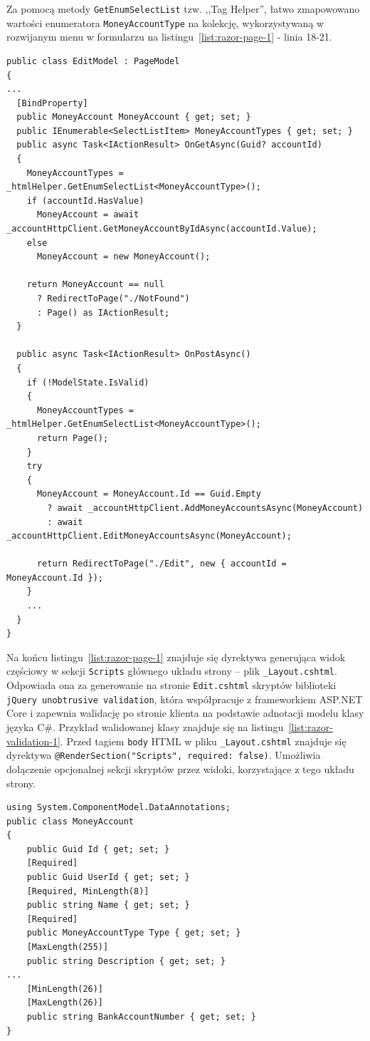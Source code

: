 Za pomocą metody \texttt{GetEnumSelectList} tzw. ,,Tag Helper'', łatwo zmapowowano wartości enumeratora \texttt{MoneyAccountType} na kolekcję, wykorzystywaną w rozwijanym menu w formularzu na listingu~\ref{list:razor-page-1} - linia 18-21.

{\belowcaptionskip=-10pt
\begin{lstlisting}[label=list:razor-page-model-1,
    caption=Przykład modelu strony Razor Page: \texttt{EditPage.cs}]
public class EditModel : PageModel
{
...
  [BindProperty]
  public MoneyAccount MoneyAccount { get; set; }
  public IEnumerable<SelectListItem> MoneyAccountTypes { get; set; }
  public async Task<IActionResult> OnGetAsync(Guid? accountId)
  {
    MoneyAccountTypes = _htmlHelper.GetEnumSelectList<MoneyAccountType>();
    if (accountId.HasValue)
      MoneyAccount = await _accountHttpClient.GetMoneyAccountByIdAsync(accountId.Value);
    else
      MoneyAccount = new MoneyAccount();
    
    return MoneyAccount == null 
      ? RedirectToPage("./NotFound")
      : Page() as IActionResult;
  }

  public async Task<IActionResult> OnPostAsync()
  {
    if (!ModelState.IsValid)
    {
      MoneyAccountTypes = _htmlHelper.GetEnumSelectList<MoneyAccountType>();
      return Page();
    }
    try
    {
      MoneyAccount = MoneyAccount.Id == Guid.Empty 
        ? await _accountHttpClient.AddMoneyAccountsAsync(MoneyAccount)
        : await _accountHttpClient.EditMoneyAccountsAsync(MoneyAccount);

      return RedirectToPage("./Edit", new { accountId = MoneyAccount.Id });
    }
    ...
  }
}
\end{lstlisting}
}

Na końcu listingu~\ref{list:razor-page-1} znajduje się dyrektywa generująca widok częściowy w sekcji \texttt{Scripts} głównego układu strony -- plik \texttt{\_Layout.cshtml}. Odpowiada ona za generowanie na stronie \texttt{Edit.cshtml} skryptów biblioteki \texttt{jQuery unobtrusive validation}, która współpracuje z frameworkiem ASP.NET Core i zapewnia walidację po stronie klienta na podstawie adnotacji modelu klasy języka C\#. Przykład walidowanej klasy znajduje się na listingu~\ref{list:razor-validation-1}. Przed tagiem \texttt{body} HTML w pliku \texttt{\_Layout.cshtml} znajduje się dyrektywa \texttt{@RenderSection("Scripts", required: false)}. Umożliwia dołączenie opcjonalnej sekcji skryptów przez widoki, korzystające z tego układu strony.


{\belowcaptionskip=-10pt
\begin{lstlisting}[label=list:razor-validation-1,
    caption=Przykład klasy z adnotacjami]
using System.ComponentModel.DataAnnotations;
public class MoneyAccount
{
    public Guid Id { get; set; }
    [Required]
    public Guid UserId { get; set; }
    [Required, MinLength(8)]
    public string Name { get; set; }
    [Required]
    public MoneyAccountType Type { get; set; }
    [MaxLength(255)]
    public string Description { get; set; }
...
    [MinLength(26)]
    [MaxLength(26)]
    public string BankAccountNumber { get; set; }
}
\end{lstlisting}
}
